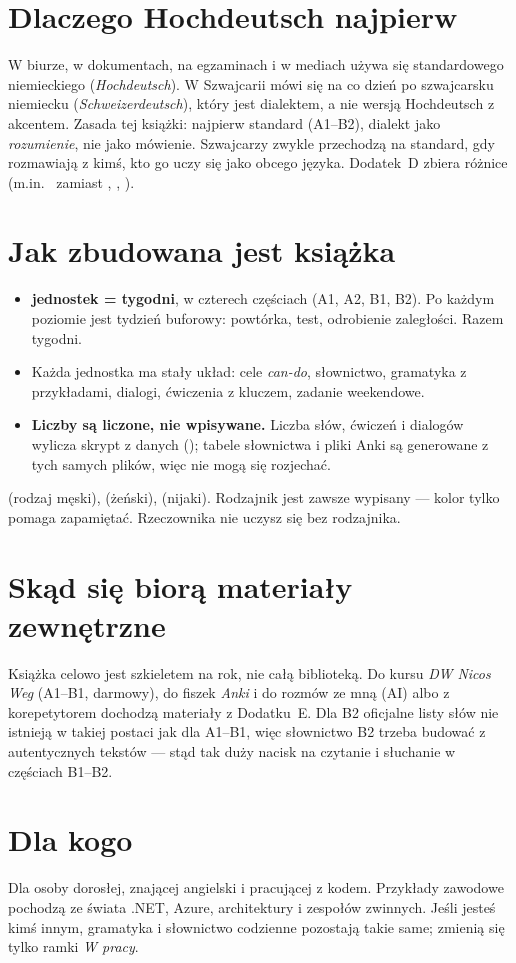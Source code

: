 \section*{Dlaczego Hochdeutsch najpierw}

W biurze, w dokumentach, na egzaminach i w mediach używa się standardowego niemieckiego
(\emph{Hochdeutsch}). W Szwajcarii mówi się na co dzień po szwajcarsku niemiecku
(\emph{Schweizerdeutsch}), który jest dialektem, a nie wersją Hochdeutsch z akcentem. Zasada tej
książki: najpierw standard (A1--B2), dialekt jako \emph{rozumienie}, nie jako mówienie.
Szwajcarzy zwykle przechodzą na standard, gdy rozmawiają z kimś, kto go uczy się jako obcego
języka. Dodatek~D zbiera różnice (m.in.\  zamiast , , ).

\section*{Jak zbudowana jest książka}

\begin{itemize}
\item \textbf{ jednostek =  tygodni}, w czterech częściach (A1, A2, B1, B2).
  Po każdym poziomie jest tydzień buforowy: powtórka, test, odrobienie zaległości. Razem
   tygodni.
\item Każda jednostka ma stały układ: cele \emph{can-do}, słownictwo, gramatyka z przykładami,
  dialogi, ćwiczenia z kluczem, zadanie weekendowe.
\item \textbf{Liczby są liczone, nie wpisywane.} Liczba słów, ćwiczeń i dialogów wylicza skrypt
  z danych (); tabele słownictwa i pliki Anki są generowane z tych samych
  plików, więc nie mogą się rozjechać.
\end{itemize}

\begin{uwaga}
 (rodzaj męski),  (żeński),  (nijaki). Rodzajnik jest zawsze
wypisany --- kolor tylko pomaga zapamiętać. Rzeczownika nie uczysz się bez rodzajnika.
\end{uwaga}

\section*{Skąd się biorą materiały zewnętrzne}

Książka celowo jest szkieletem na rok, nie całą biblioteką. Do kursu \emph{DW Nicos Weg}
(A1--B1, darmowy), do fiszek \emph{Anki} i do rozmów ze mną (AI) albo z korepetytorem dochodzą
materiały z Dodatku~E. Dla B2 oficjalne listy słów nie istnieją w takiej postaci jak dla A1--B1,
więc słownictwo B2 trzeba budować z autentycznych tekstów --- stąd tak duży nacisk na czytanie
i słuchanie w częściach B1--B2.

\section*{Dla kogo}

Dla osoby dorosłej, znającej angielski i pracującej z kodem. Przykłady zawodowe pochodzą ze
świata .NET, Azure, architektury i zespołów zwinnych. Jeśli jesteś kimś innym, gramatyka i
słownictwo codzienne pozostają takie same; zmienią się tylko ramki \emph{W pracy}.

